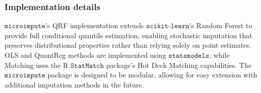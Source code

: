 \subsubsection{Implementation details}

$\texttt{microimpute}$'s QRF implementation extends $\texttt{scikit-learn}$'s Random Forest to provide full conditional quantile estimation, enabling stochastic imputation that preserves distributional properties rather than relying solely on point estimates. OLS and QuantReg methods are implemented using $\texttt{statsmodels}$, while Matching uses the R $\texttt{StatMatch}$ package's Hot Deck Matching capabilities. The $\texttt{microimpute}$ package is designed to be modular, allowing for easy extension with additional imputation methods in the future.